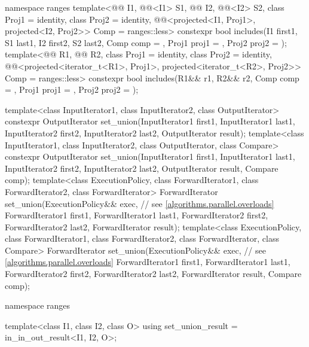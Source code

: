 \begin{codeblock}
{  namespace ranges {
    template<@@ I1, @@<I1> S1, @@ I2, @@<I2> S2,
             class Proj1 = identity, class Proj2 = identity,
             @@<projected<I1, Proj1>, projected<I2, Proj2>> Comp =
               ranges::less>
      constexpr bool includes(I1 first1, S1 last1, I2 first2, S2 last2, Comp comp = {},
                              Proj1 proj1 = {}, Proj2 proj2 = {});
    template<@@ R1, @@ R2, class Proj1 = identity,
             class Proj2 = identity,
             @@<projected<iterator_t<R1>, Proj1>,
                                        projected<iterator_t<R2>, Proj2>> Comp = ranges::less>
      constexpr bool includes(R1&& r1, R2&& r2, Comp comp = {},
                              Proj1 proj1 = {}, Proj2 proj2 = {});
  }

  template<class InputIterator1, class InputIterator2, class OutputIterator>
    constexpr OutputIterator
      set_union(InputIterator1 first1, InputIterator1 last1,
                InputIterator2 first2, InputIterator2 last2,
                OutputIterator result);
  template<class InputIterator1, class InputIterator2, class OutputIterator, class Compare>
    constexpr OutputIterator
                set_union(InputIterator1 first1, InputIterator1 last1,
                InputIterator2 first2, InputIterator2 last2,
                OutputIterator result, Compare comp);
  template<class ExecutionPolicy, class ForwardIterator1, class ForwardIterator2,
           class ForwardIterator>
    ForwardIterator
      set_union(ExecutionPolicy&& exec,                         // see \ref{algorithms.parallel.overloads}
                ForwardIterator1 first1, ForwardIterator1 last1,
                ForwardIterator2 first2, ForwardIterator2 last2,
                ForwardIterator result);
  template<class ExecutionPolicy, class ForwardIterator1, class ForwardIterator2,
           class ForwardIterator, class Compare>
    ForwardIterator
      set_union(ExecutionPolicy&& exec,                         // see \ref{algorithms.parallel.overloads}
                ForwardIterator1 first1, ForwardIterator1 last1,
                ForwardIterator2 first2, ForwardIterator2 last2,
                ForwardIterator result, Compare comp);

  namespace ranges {
    template<class I1, class I2, class O>
      using set_union_result = in_in_out_result<I1, I2, O>;

}}
\end{codeblock}
